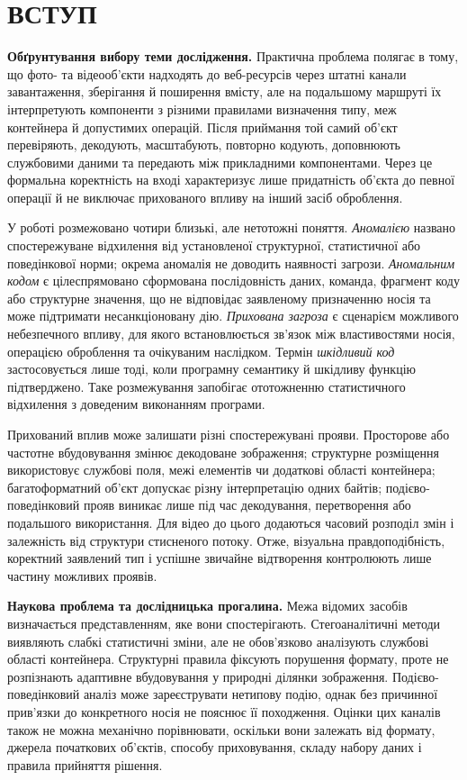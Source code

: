 \chapter*{ВСТУП}

\textbf{Обґрунтування вибору теми дослідження.}
Практична проблема полягає в тому, що фото- та відеооб’єкти надходять до веб-ресурсів через штатні канали завантаження, зберігання й поширення вмісту, але на подальшому маршруті їх інтерпретують компоненти з різними правилами визначення типу, меж контейнера й допустимих операцій. Після приймання той самий об’єкт перевіряють, декодують, масштабують, повторно кодують, доповнюють службовими даними та передають між прикладними компонентами. Через це формальна коректність на вході характеризує лише придатність об’єкта до певної операції й не виключає прихованого впливу на інший засіб оброблення.

У роботі розмежовано чотири близькі, але нетотожні поняття. \textit{Аномалією} названо спостережуване відхилення від установленої структурної, статистичної або поведінкової норми; окрема аномалія не доводить наявності загрози. \textit{Аномальним кодом} є цілеспрямовано сформована послідовність даних, команда, фрагмент коду або структурне значення, що не відповідає заявленому призначенню носія та може підтримати несанкціоновану дію. \textit{Прихована загроза} є сценарієм можливого небезпечного впливу, для якого встановлюється зв’язок між властивостями носія, операцією оброблення та очікуваним наслідком. Термін \textit{шкідливий код} застосовується лише тоді, коли програмну семантику й шкідливу функцію підтверджено. Таке розмежування запобігає ототожненню статистичного відхилення з доведеним виконанням програми.

Прихований вплив може залишати різні спостережувані прояви. Просторове або частотне вбудовування змінює декодоване зображення; структурне розміщення використовує службові поля, межі елементів чи додаткові області контейнера; багатоформатний об’єкт допускає різну інтерпретацію одних байтів; подієво-поведінковий прояв виникає лише під час декодування, перетворення або подальшого використання. Для відео до цього додаються часовий розподіл змін і залежність від структури стисненого потоку. Отже, візуальна правдоподібність, коректний заявлений тип і успішне звичайне відтворення контролюють лише частину можливих проявів.

\textbf{Наукова проблема та дослідницька прогалина.}
Межа відомих засобів визначається представленням, яке вони спостерігають. Стегоаналітичні методи виявляють слабкі статистичні зміни, але не обов’язково аналізують службові області контейнера. Структурні правила фіксують порушення формату, проте не розпізнають адаптивне вбудовування у природні ділянки зображення. Подієво-поведінковий аналіз може зареєструвати нетипову подію, однак без причинної прив’язки до конкретного носія не пояснює її походження. Оцінки цих каналів також не можна механічно порівнювати, оскільки вони залежать від формату, джерела початкових об’єктів, способу приховування, складу набору даних і правила прийняття рішення.

